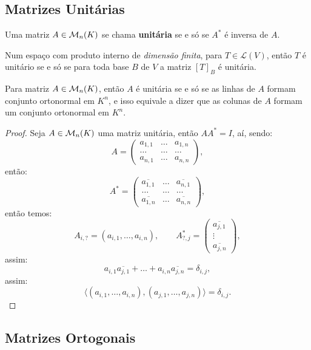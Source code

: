 \documentclass[11pt,twoside,a4paper]{book}
\begin{document}
\subsection{Matrizes Unitárias}

\begin{definicao}
Uma matriz $A\in\mathcal{M}_{n}(K)$ se chama \textbf{unitária} se e só se $A^*$ é inversa de $A$. 
\end{definicao}

\begin{corolario}
Num espaço com produto interno de \emph{dimensão finita}, para $T\in\mathcal{L}(V)$, então $T$ é unitário se e só se para toda base $B$ de $V$ a matriz $[T]_B$ é unitária.
\end{corolario}

\begin{teorema}
Para matriz $A\in\mathcal{M}_{n}(K)$, então $A$ é unitária se e só se as linhas de $A$ formam conjunto ortonormal em $K^n$, e isso equivale a dizer que as colunas de $A$ formam um conjunto ortonormal em $K^n$.
\end{teorema}
\begin{proof}
Seja $A\in\mathcal{M}_{n}(K)$ uma matriz unitária, então $AA^*=I$, aí, sendo:
\[
A=\begin{pmatrix}
a_{1,1}&\dots&a_{1,n}\\\dots&\dots&\dots\\a_{n,1}&\dots&a_{n,n}
\end{pmatrix},
\]
então:
\[
A^*=\begin{pmatrix}
\overline{a_{1,1}}&\dots&\overline{a_{n,1}}\\\dots&\dots&\dots\\\overline{a_{1,n}}&\dots&\overline{a_{n,n}}
\end{pmatrix},
\]
então temos:
\[
A_{i,?}=(a_{i,1},\dots,a_{i,n}),\quad\quad A^*_{?,j}=\begin{pmatrix}
\overline{a_{j,1}}\\\vdots\\\overline{a_{j,n}}
\end{pmatrix},
\]
assim:
\[
a_{i,1}\overline{a_{j,1}}+\dots+a_{i,n}\overline{a_{j,n}}=\delta_{i,j},
\]
assim:
\[
\langle(a_{i,1},\dots,a_{i,n}),(a_{j,1},\dots,a_{j,n})\rangle=\delta_{i,j}.
\]
\end{proof}

\subsection{Matrizes Ortogonais}
\end{document}
